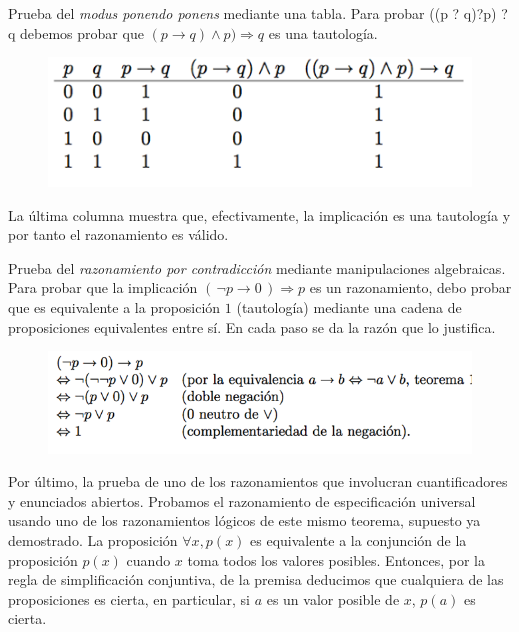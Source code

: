 Prueba del \emph{modus ponendo ponens} mediante una tabla. Para probar ((p ? q)?p) ? q debemos probar que $(p \to  q) \wedge p) \Rightarrow q$ es una tautología. 

\begin{figure}[H] 
		\centering
		\includegraphics[width=.85\textwidth]{imagenes/apendices/APENDICESIM30.png}
	\end{figure}

La última columna muestra que, efectivamente, la implicación es una tautología y por tanto el razonamiento es válido.

Prueba del \emph{razonamiento por contradicción} mediante manipulaciones algebraicas. Para probar que la implicación $(\, \neg p \to  0\, ) \Rightarrow p$ es un razonamiento, debo probar que es equivalente a la proposición $1$ (tautología) mediante una cadena de proposiciones equivalentes entre sí. En cada paso se da la razón que lo justifica.

\begin{figure}[H] 
		\centering
		\includegraphics[width=.85\textwidth]{imagenes/apendices/APENDICESIM31.png}
	\end{figure}


Por último, la prueba de uno de los razonamientos que involucran cuantificadores y enunciados abiertos. Probamos el razonamiento de especificación universal usando uno de los razonamientos lógicos de este mismo teorema, supuesto ya demostrado. La proposición $\forall x, p(x)$ es equivalente a la conjunción de la proposición $p(x)$ cuando $x$ toma todos los valores posibles. Entonces, por la regla de simplificación conjuntiva, de la premisa deducimos que cualquiera de las proposiciones es cierta, en particular, si $a$ es un valor posible de $x$, $p(a)$ es cierta.

\rightline{$\Box$}


